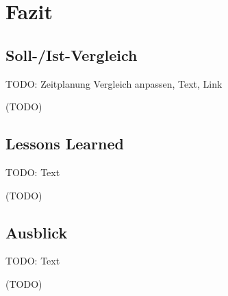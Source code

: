 \section{Fazit} 
\label{sec:Fazit}

\subsection{Soll-/Ist-Vergleich}
\label{sec:SollIstVergleich}

TODO: Zeitplanung Vergleich anpassen, Text, Link

(TODO)


\subsection{Lessons Learned}
\label{sec:LessonsLearned}

TODO: Text

(TODO)

\subsection{Ausblick}
\label{sec:Ausblick}

TODO: Text

(TODO)
